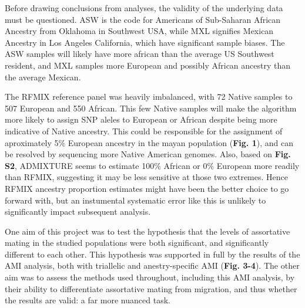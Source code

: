\documentclass[11pt]{article}
\begin{document}




Before drawing conclusions from analyses, the validity of the underlying data must be questioned. ASW is the code for Americans of Sub-Saharan African Ancestry from Oklahoma in Southwest USA, while MXL signifies Mexican Ancestry in Los Angeles California, which have significant sample biases. The ASW samples will likely have more african than the average US Southwest resident, and MXL samples more European and possibly African ancestry than the average Mexican.

The RFMIX reference panel was heavily imbalanced, with 72 Native samples to 507 European and 550 African. This few Native samples will make the algorithm more likely to assign SNP aleles to European or African despite being more indicative of Native ancestry. This could be responsible for the assignment of aproximately 5\% European ancestry in the mayan population (\textbf{Fig. 1}), and can be resolved by sequencing more Native American genomes. Also, based on \textbf{Fig. S2}, ADMIXTURE seems to estimate 100\% African or 0\% European more readily than RFMIX, suggesting it may be less sensitive at those two extremes. Hence RFMIX ancestry proportion estimates might have been the better choice to go forward with, but an instumental systematic error like this is unlikely to significantly impact subsequent analysis.

One aim of this project was to test the hypothesis that the levels of assortative mating in the studied populations were both significant, and significantly different to each other. This hypothesis was supported in full by the results of the AMI analysis, both with triallelic and anestry-specific AMI (\textbf{Fig. 3-4}). The other aim was to assess the methods used throughout, including this AMI analysis, by their ability to differentiate assortative mating from migration, and thus whether the results are valid: a far more nuanced task.
\end{document}
